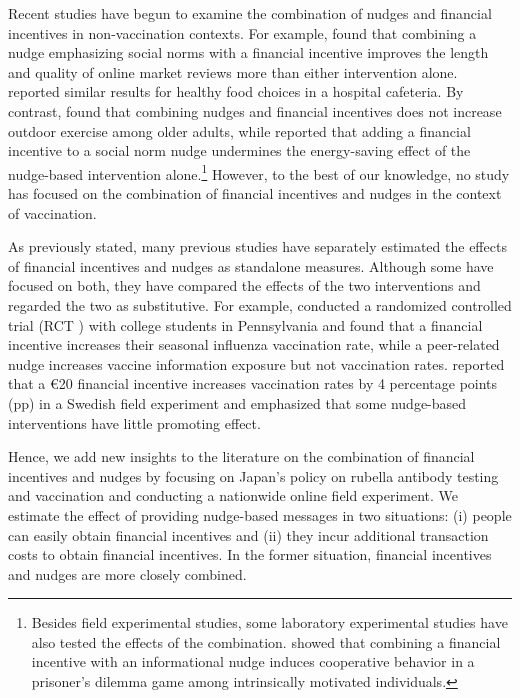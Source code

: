 \documentclass[
]{article}
\begin{document}
Recent studies have begun to examine the combination of nudges and financial incentives in non-vaccination contexts. For example, \citet{Burtch2018} found that combining a nudge emphasizing social norms with a financial incentive improves the length and quality of online market reviews more than either intervention alone. \citet{Thorndike2016} reported similar results for healthy food choices in a hospital cafeteria. By contrast, \citet{Kullgren2014} found that combining nudges and financial incentives does not increase outdoor exercise among older adults, while \citet{Pellerano2017} reported that adding a financial incentive to a social norm nudge undermines the energy-saving effect of the nudge-based intervention alone.\footnote{Besides field experimental studies, some laboratory experimental studies have also tested the effects of the combination. \citet{Chen2021} showed that combining a financial incentive with an informational nudge induces cooperative behavior in a prisoner's dilemma game among intrinsically motivated individuals.} However, to the best of our knowledge, no study has focused on the combination of financial incentives and nudges in the context of vaccination.

As previously stated, many previous studies have separately estimated the effects of financial incentives \citep{Banerjee2010, Barber2022, Barham2009, Brehm2022} and nudges \citep{Dai2021, Chapman2010, Milkman2021, Sasaki2022} as standalone measures. Although some have focused on both, they have compared the effects of the two interventions and regarded the two as substitutive. For example, \citet{Bronchetti2015} conducted a randomized controlled trial (RCT ) with college students in Pennsylvania and found that a financial incentive increases their seasonal influenza vaccination rate, while a peer-related nudge increases vaccine information exposure but not vaccination rates. \citet{Campos-Mercade2021a} reported that a €20 financial incentive increases vaccination rates by 4 percentage points (pp) in a Swedish field experiment and emphasized that some nudge-based interventions have little promoting effect.

Hence, we add new insights to the literature on the combination of financial incentives and nudges by focusing on Japan's policy on rubella antibody testing and vaccination and conducting a nationwide online field experiment. We estimate the effect of providing nudge-based messages in two situations: (i) people can easily obtain financial incentives and (ii) they incur additional transaction costs to obtain financial incentives. In the former situation, financial incentives and nudges are more closely combined.
\end{document}
